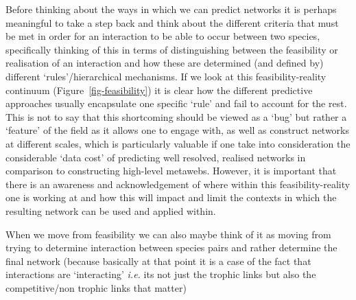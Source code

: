 \documentclass[
]{article}
\begin{document}
\begin{tcolorbox}[enhanced jigsaw, colback=white, opacitybacktitle=0.6, titlerule=0mm, opacityback=0, coltitle=black, title=\textcolor{quarto-callout-note-color}{\faInfo}\hspace{0.5em}{Box 1 - Moving between the feasibility and reality of interactions}, bottomrule=.15mm, toprule=.15mm, toptitle=1mm, left=2mm, colframe=quarto-callout-note-color-frame, breakable, arc=.35mm, colbacktitle=quarto-callout-note-color!10!white, bottomtitle=1mm, leftrule=.75mm, rightrule=.15mm]

Before thinking about the ways in which we can predict networks it is
perhaps meaningful to take a step back and think about the different
criteria that must be met in order for an interaction to be able to
occur between two species, specifically thinking of this in terms of
distinguishing between the feasibility or realisation of an interaction
and how these are determined (and defined by) different
`rules'/hierarchical mechanisms. If we look at this feasibility-reality
continuum (Figure~\ref{fig-feasibility}) it is clear how the different
predictive approaches usually encapsulate one specific `rule' and fail
to account for the rest. This is not to say that this shortcoming should
be viewed as a `bug' but rather a `feature' of the field as it allows
one to engage with, as well as construct networks at different scales,
which is particularly valuable if one take into consideration the
considerable `data cost' of predicting well resolved, realised networks
in comparison to constructing high-level metawebs. However, it is
important that there is an awareness and acknowledgement of where within
this feasibility-reality one is working at and how this will impact and
limit the contexts in which the resulting network can be used and
applied within.

When we move from feasibility we can also maybe think of it as moving
from trying to determine interaction between species pairs and rather
determine the final network (because basically at that point it is a
case of the fact that interactions are `interacting' \emph{i.e.} its not
just the trophic links but also the competitive/non trophic links that
matter)

\begin{figure}[H]

\centering{

}
\end{figure}
\end{tcolorbox}
\end{document}
